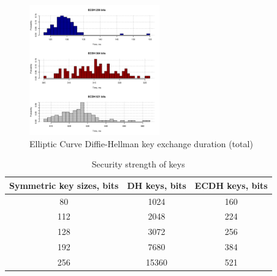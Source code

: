\begin{figure}
	\includegraphics[width=0.5\textwidth]{graphics/ecdh_computation_hist.pdf}
	\caption{Elliptic Curve Diffie-Hellman key exchange duration (total)}
	\label{fig:ecdh}
\end{figure}

\begin{table}
\centering
\begin{tabular}{|c|c|c|}
\hline
\bf{Symmetric key sizes, bits} & \bf{DH keys, bits} & \bf{ECDH keys, bits} \\\hline
		80			&    1024                        & 160                                  \\
		112			&    2048                        & 224                                  \\
		128			&    3072                        & 256                                  \\
		192			&    7680                        & 384                                  \\
		256			&    15360                       & 521                                  \\
\hline
\end{tabular}
\caption{Security strength of keys}
\label{tab:strength}
\end{table}

~\cite{dummy}
